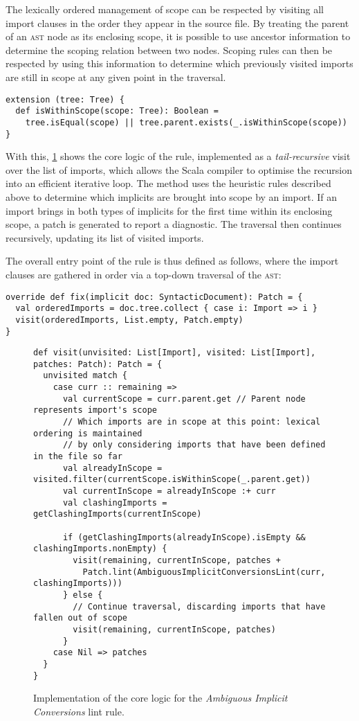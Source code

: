 \documentclass[../../main.tex]{subfiles}
\begin{document}
The lexically ordered management of scope can be respected by visiting all import clauses in the order they appear in the source file.
By treating the parent of an \textsc{ast} node as its enclosing scope, it is possible to use ancestor information to determine the scoping relation between two nodes.
Scoping rules can then be respected by using this information to determine which previously visited imports are still in scope at any given point in the traversal.
\begin{verbatim}
extension (tree: Tree) {
  def isWithinScope(scope: Tree): Boolean =
    tree.isEqual(scope) || tree.parent.exists(_.isWithinScope(scope))
}
\end{verbatim}
%
With this, \cref{fig:ambiguous-implicits-impl} shows the core logic of the rule, implemented as a \emph{tail-recursive} visit over the list of imports, which allows the Scala compiler to optimise the recursion into an efficient iterative loop.
The  method uses the heuristic rules described above to determine which implicits are brought into scope by an import.
If an import brings in both types of implicits for the first time within its enclosing scope, a patch is generated to report a diagnostic.
The traversal then continues recursively, updating its list of visited imports.

The overall entry point of the rule is thus defined as follows, where the import clauses are gathered in order via a top-down traversal of the \textsc{ast}:
\begin{verbatim}
override def fix(implicit doc: SyntacticDocument): Patch = {
  val orderedImports = doc.tree.collect { case i: Import => i }
  visit(orderedImports, List.empty, Patch.empty)
}
\end{verbatim}

\begin{figure}[htbp]
\begin{verbatim}
def visit(unvisited: List[Import], visited: List[Import], patches: Patch): Patch = {
  unvisited match {
    case curr :: remaining =>
      val currentScope = curr.parent.get // Parent node represents import's scope
      // Which imports are in scope at this point: lexical ordering is maintained
      // by only considering imports that have been defined in the file so far
      val alreadyInScope = visited.filter(currentScope.isWithinScope(_.parent.get))
      val currentInScope = alreadyInScope :+ curr
      val clashingImports = getClashingImports(currentInScope)

      if (getClashingImports(alreadyInScope).isEmpty && clashingImports.nonEmpty) {
        visit(remaining, currentInScope, patches +
          Patch.lint(AmbiguousImplicitConversionsLint(curr, clashingImports)))
      } else {
        // Continue traversal, discarding imports that have fallen out of scope
        visit(remaining, currentInScope, patches)
      }
    case Nil => patches
  }
}
\end{verbatim}
\caption{Implementation of the core logic for the \emph{Ambiguous Implicit Conversions} lint rule.}
\label{fig:ambiguous-implicits-impl}
\end{figure}
\end{document}
